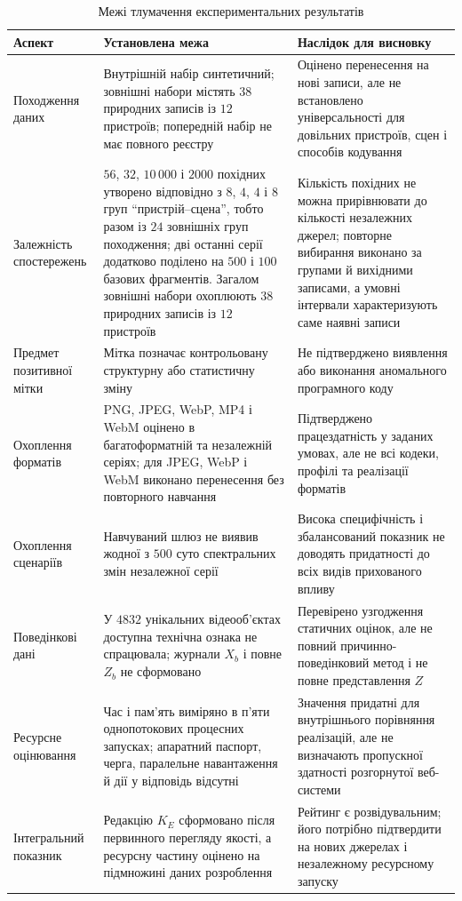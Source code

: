 \begin{table}[htbp]
\caption{Межі тлумачення експериментальних результатів}
\label{tab:ch4_validity_limits}
\centering
\small
\begin{tabularx}{\textwidth}{p{}Y Y}
\toprule
Аспект & Установлена межа & Наслідок для висновку \\
\midrule
Походження даних & Внутрішній набір синтетичний; зовнішні набори містять $38$ природних записів із $12$ пристроїв; попередній набір не має повного реєстру & Оцінено перенесення на нові записи, але не встановлено універсальності для довільних пристроїв, сцен і способів кодування \\
Залежність спостережень & $56$, $32$, $10\,000$ і $2000$ похідних утворено відповідно з $8$, $4$, $4$ і $8$ груп ``пристрій--сцена'', тобто разом із $24$ зовнішніх груп походження; дві останні серії додатково поділено на $500$ і $100$ базових фрагментів. Загалом зовнішні набори охоплюють $38$ природних записів із $12$ пристроїв & Кількість похідних не можна прирівнювати до кількості незалежних джерел; повторне вибирання виконано за групами й вихідними записами, а умовні інтервали характеризують саме наявні записи \\
Предмет позитивної мітки & Мітка позначає контрольовану структурну або статистичну зміну & Не підтверджено виявлення або виконання аномального програмного коду \\
Охоплення форматів & PNG, JPEG, WebP, MP4 і WebM оцінено в багатоформатній та незалежній серіях; для JPEG, WebP і WebM виконано перенесення без повторного навчання & Підтверджено працездатність у заданих умовах, але не всі кодеки, профілі та реалізації форматів \\
Охоплення сценаріїв & Навчуваний шлюз не виявив жодної з $500$ суто спектральних змін незалежної серії & Висока специфічність і збалансований показник не доводять придатності до всіх видів прихованого впливу \\
Поведінкові дані & У $4832$ унікальних відеооб’єктах доступна технічна ознака не спрацювала; журнали $X_b$ і повне $Z_b$ не сформовано & Перевірено узгодження статичних оцінок, але не повний причинно-поведінковий метод і не повне представлення $Z$ \\
Ресурсне оцінювання & Час і пам’ять виміряно в п’яти однопотокових процесних запусках; апаратний паспорт, черга, паралельне навантаження й дії у відповідь відсутні & Значення придатні для внутрішнього порівняння реалізацій, але не визначають пропускної здатності розгорнутої веб-системи \\
Інтегральний показник & Редакцію $K_E$ сформовано після первинного перегляду якості, а ресурсну частину оцінено на підмножині даних розроблення & Рейтинг є розвідувальним; його потрібно підтвердити на нових джерелах і незалежному ресурсному запуску \\
\bottomrule
\end{tabularx}
\end{table}

